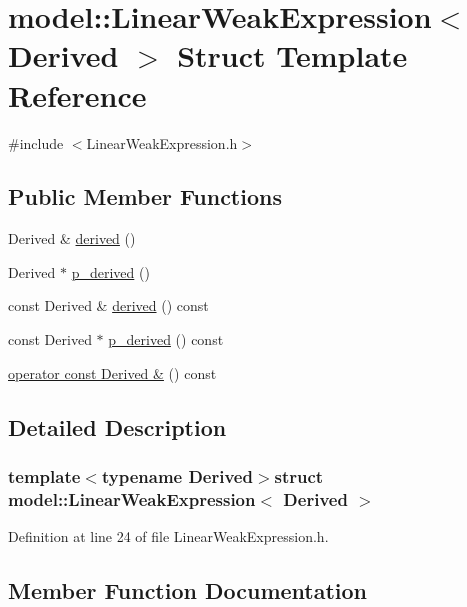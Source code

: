 \hypertarget{structmodel_1_1_linear_weak_expression}{}\section{model\+:\+:Linear\+Weak\+Expression$<$ Derived $>$ Struct Template Reference}
\label{structmodel_1_1_linear_weak_expression}


{\ttfamily \#include $<$Linear\+Weak\+Expression.\+h$>$}

\subsection*{Public Member Functions}
\begin{DoxyCompactItemize}
\item 
Derived \& \hyperlink{structmodel_1_1_linear_weak_expression_aa0ca7fcdafabffdb9919f9d7f86fef56}{derived} ()
\item 
Derived $\ast$ \hyperlink{structmodel_1_1_linear_weak_expression_aa8916b812941ef49f1c281f34e7e7ed1}{p\+\_\+derived} ()
\item 
const Derived \& \hyperlink{structmodel_1_1_linear_weak_expression_a899ff2ffa77c403f835bb51747efc1ce}{derived} () const 
\item 
const Derived $\ast$ \hyperlink{structmodel_1_1_linear_weak_expression_ac2ce21e76f8f5f0cfda2f58a259b908e}{p\+\_\+derived} () const 
\item 
\hyperlink{structmodel_1_1_linear_weak_expression_aab2da26fd2fb7af5a2dd34c9dcfb44ce}{operator const Derived \&} () const 
\end{DoxyCompactItemize}


\subsection{Detailed Description}
\subsubsection*{template$<$typename Derived$>$struct model\+::\+Linear\+Weak\+Expression$<$ Derived $>$}



Definition at line 24 of file Linear\+Weak\+Expression.\+h.



\subsection{Member Function Documentation}
\hypertarget{structmodel_1_1_linear_weak_expression_aa0ca7fcdafabffdb9919f9d7f86fef56}{}
